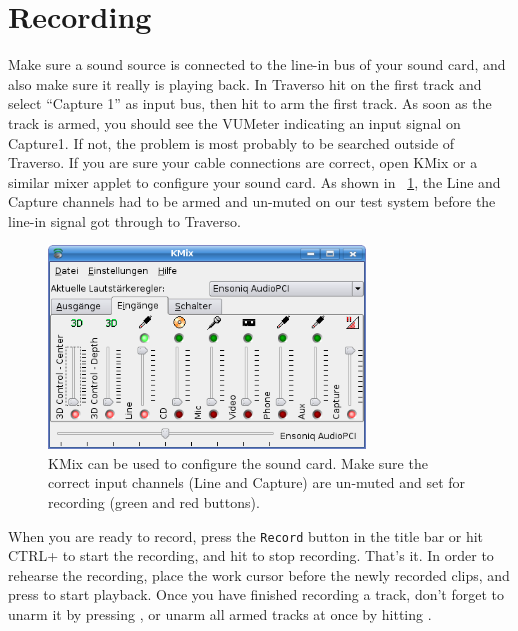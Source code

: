 \section{Recording}
Make sure a sound source is connected to the line-in bus of your sound card, and also make sure it really is playing back. In Traverso hit  on the first track and select ``Capture 1'' as input bus, then hit  to arm the first track. As soon as the track is armed, you should see the VUMeter indicating an input signal on Capture1. If not, the problem is most probably to be searched outside of Traverso. If you are sure your cable connections are correct, open KMix or a similar mixer applet to configure your sound card. As shown in \FigT\ \ref{fig_kmix01}, the Line and Capture channels had to be armed and un-muted on our test system before the line-in signal got through to Traverso.

\begin{figure}
 \centering\includegraphics[width=0.75\textwidth]{images/kmix01.png}
 \caption{KMix can be used to configure the sound card. Make sure the correct input channels (Line and Capture) are un-muted and set for recording (green and red buttons).}
 \label{fig_kmix01}
\end{figure}

When you are ready to record, press the \texttt{Record} button in the title bar or hit CTRL+ to start the recording, and hit  to stop recording. That's it. In order to rehearse the recording, place the work cursor before the newly recorded clips, and press  to start playback. Once you have finished recording a track, don't forget to unarm it by pressing , or unarm all armed tracks at once by hitting .

